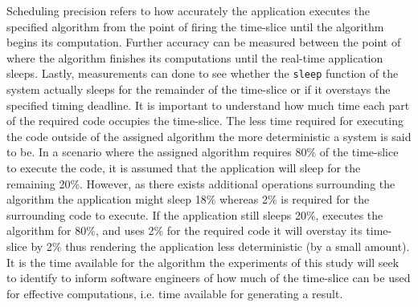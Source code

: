 Scheduling precision refers to how accurately the application executes the specified algorithm from the point of firing the time-slice until the algorithm begins its computation. Further accuracy can be measured between the point of where the algorithm finishes its computations until the real-time application sleeps. Lastly, measurements can done to see whether the \texttt{sleep} function of the system actually sleeps for the remainder of the time-slice or if it overstays the specified timing deadline. It is important to understand how much time each part of the required code occupies the time-slice. The less time required for executing the code outside of the assigned algorithm the more deterministic a system is said to be. In a scenario where the assigned algorithm requires 80\% of the time-slice to execute the code, it is assumed that the application will sleep for the remaining 20\%. However, as there exists additional operations surrounding the algorithm the application might sleep 18\% whereas 2\% is required for the surrounding code to execute. If the application still sleeps 20\%, executes the algorithm for 80\%, and uses 2\% for the required code it will overstay its time-slice by 2\% thus rendering the application less deterministic (by a small amount). It is the time available for the algorithm the experiments of this study will seek to identify to inform software engineers of how much of the time-slice can be used for effective computations, i.e. time available for generating a result.


